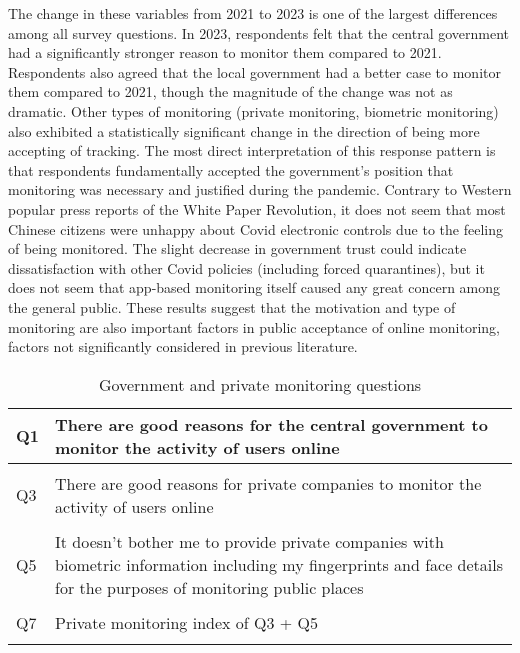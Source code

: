\documentclass[
  letterpaper,
  DIV=11,
  numbers=noendperiod]{scrartcl}
\begin{document}
The change in these variables from 2021 to 2023 is one of the largest
differences among all survey questions. In 2023, respondents felt that
the central government had a significantly stronger reason to monitor
them compared to 2021. Respondents also agreed that the local government
had a better case to monitor them compared to 2021, though the magnitude
of the change was not as dramatic. Other types of monitoring (private
monitoring, biometric monitoring) also exhibited a statistically
significant change in the direction of being more accepting of tracking.
The most direct interpretation of this response pattern is that
respondents fundamentally accepted the government's position that
monitoring was necessary and justified during the pandemic. Contrary to
Western popular press reports of the White Paper Revolution, it does not
seem that most Chinese citizens were unhappy about Covid electronic
controls due to the feeling of being monitored. The slight decrease in
government trust could indicate dissatisfaction with other Covid
policies (including forced quarantines), but it does not seem that
app-based monitoring itself caused any great concern among the general
public. These results suggest that the motivation and type of monitoring
are also important factors in public acceptance of online monitoring,
factors not significantly considered in previous literature.

\hypertarget{tbl-gm.q.text}{}
\begin{table}
\caption{\label{tbl-gm.q.text}Government and private monitoring questions }\tabularnewline

\centering
\begin{tabular}[t]{l|>{\raggedright\arraybackslash}p{5in}}
\hline
Q1 & There are good reasons for the central government to monitor the activity of users online\\
\hline
\cellcolor{gray!6}{Q2} & \cellcolor{gray!6}{There are good reasons for the local government to monitor the activity of users online}\\
\hline
Q3 & There are good reasons for private companies to monitor the activity of users online\\
\hline
\cellcolor{gray!6}{Q4} & \cellcolor{gray!6}{It doesn’t bother me to provide the government with biometric information including my fingerprints and face details for the purposes of monitoring public places}\\
\hline
Q5 & It doesn’t bother me to provide private companies with biometric information including my fingerprints and face details for the purposes of monitoring public places\\
\hline
\cellcolor{gray!6}{Q6} & \cellcolor{gray!6}{Government monitoring index of Q1 + Q2 + Q4}\\
\hline
Q7 & Private monitoring index of Q3 + Q5\\
\hline
\cellcolor{gray!6}{Q8} & \cellcolor{gray!6}{Total monitoring index of Q1-Q5}\\
\hline
\end{tabular}
\end{table}
\end{document}
